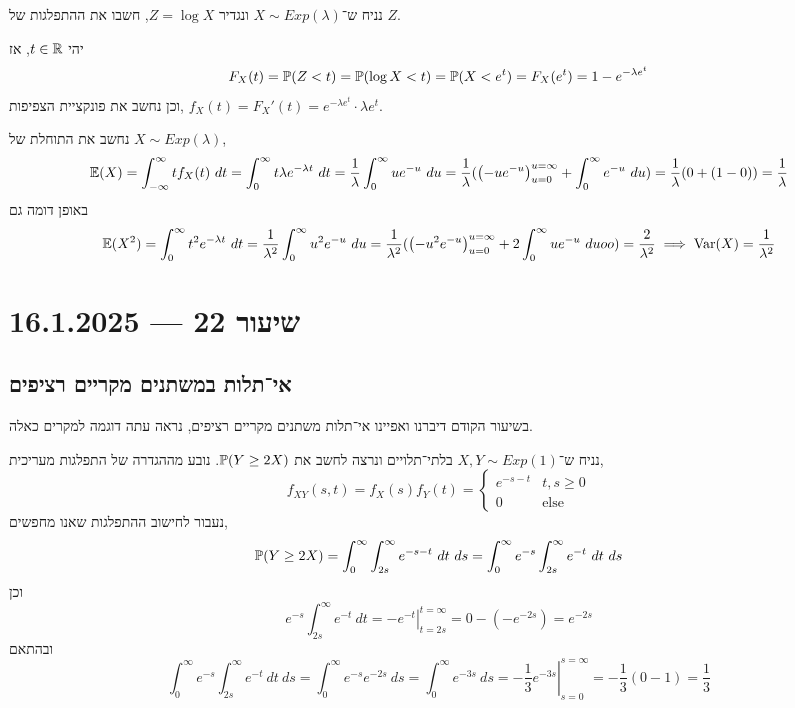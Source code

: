 \begin{exercise}
	נניח ש־$X \sim Exp(\lambda)$ ונגדיר $Z = \log X$, חשבו את ההתפלגות של $Z$.
\end{exercise}
\begin{solution}
	יהי $t \in \mathbb{R}$, אז
	\[
		F_X(t)
		= \mathbb{P}(Z < t)
		= \mathbb{P}(\log X < t)
		= \mathbb{P}(X < e^t)
		= F_X(e^t)
		= 1 - e^{-\lambda e^t}
	\]
	וכן נחשב את פונקציית הצפיפות, $ f_X(t) = F_X'(t) = e^{-\lambda e^t} \cdot \lambda e^t$.
\end{solution}
\begin{example}
	נחשב את התוחלת של $X \sim Exp(\lambda)$,
	\[
		\mathbb{E}(X)
		= \int_{-\infty}^{\infty} t f_X(t)\ dt
		= \int_{0}^{\infty} t \lambda e^{-\lambda t}\ dt
		= \frac{1}{\lambda} \int_{0}^{\infty} u e^{-u}\ du
		= \frac{1}{\lambda} ({\left( - u e^{-u} \right)}_{u = 0}^{u = \infty} + \int_{0}^{\infty} e^{-u}\ du)
		= \frac{1}{\lambda} (0 + (1 - 0))
		= \frac{1}{\lambda}
	\]
	באופן דומה גם
	\[
		\mathbb{E}(X^2)
		= \int_{0}^{\infty} t^2 e^{-\lambda t}\ dt
		= \frac{1}{\lambda^2} \int_{0}^{\infty} u^2 e^{-u}\ du
		= \frac{1}{\lambda^2} ({\left(-u^2 e^{-u}\right)}_{u = 0}^{u = \infty} + 2 \int_{0}^{\infty} u e^{-u}\ duoo)
		= \frac{2}{\lambda^2}
		\implies
		\operatorname{Var}(X)
		= \frac{1}{\lambda^2}
	\]
\end{example}

\section{שיעור 22 --- 16.1.2025}
\subsection{אי־תלות  במשתנים מקריים רציפים}
בשיעור הקודם דיברנו ואפיינו אי־תלות משתנים מקריים רציפים, נראה עתה דוגמה למקרים כאלה.
\begin{example}
	נניח ש־$X, Y \sim Exp(1)$ בלתי־תלויים ונרצה לחשב את $\mathbb{P}(Y \ge 2X)$.
	נובע מההגדרה של התפלגות מעריכית,
	\[
		f_{X Y}(s, t)
		= f_X(s) f_Y(t)
		= \begin{cases}
			e^{-s - t} & t, s \ge 0 \\
			0 & \text{else}
		\end{cases}
	\]
	נעבור לחישוב ההתפלגות שאנו מחפשים,
	\[
		\PP(Y \ge 2X)
		= \int_{0}^{\infty} \int_{2s}^{\infty} e^{-s - t}\ dt\ ds
		= \int_{0}^{\infty} e^{-s} \int_{2s}^{\infty} e^{-t}\ dt\ ds
	\]
	וכן
	\[
		e^{-s} \int_{2s}^{\infty} e^{-t}\ dt
		= \left. -e^{-t} \right\rvert_{t = 2s}^{t = \infty}
		= 0 - (-e^{-2s})
		= e^{-2s}
	\]
	ובהתאם
	\[
		\int_{0}^{\infty} e^{-s} \int_{2s}^{\infty} e^{-t}\ dt\ ds
		= \int_{0}^{\infty} e^{-s} e^{-2s}\ ds
		= \int_{0}^{\infty} e^{-3s}\ ds
		= \left. -\frac{1}{3} e^{-3s} \right\rvert_{s = 0}^{s = \infty}
		= -\frac{1}{3}(0 - 1)
		= \frac{1}{3}
	\]
\end{example}

